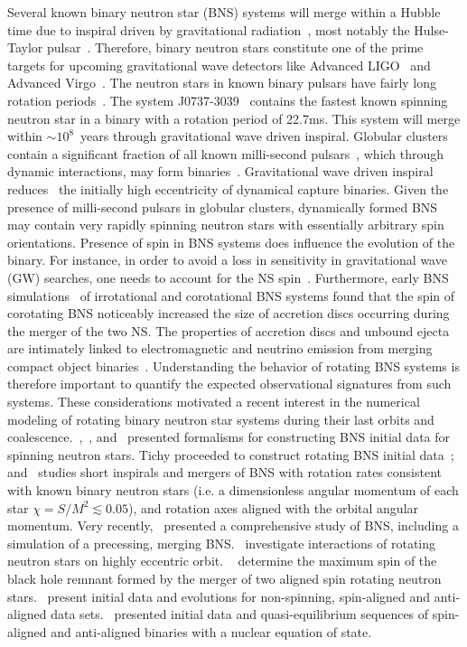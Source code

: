 Several known binary neutron star (BNS) systems  will merge within a
Hubble time due to inspiral driven by gravitational
radiation~\citep{Lorimer2008}, most notably the Hulse-Taylor
pulsar~\citep{Hulse:1975uf}. Therefore, binary neutron stars
constitute one of the prime targets for upcoming gravitational wave
detectors like Advanced LIGO~\citep{aLIGO1,aLIGO2} and Advanced
Virgo~\citep{AdV,TheVirgo:2014hva}.
The neutron stars in known binary pulsars have fairly long rotation
periods~\citep{Lorimer2008}. The system J0737-3039~\citep{Lyne:2004cj}
contains the fastest known spinning neutron star in a binary with a
rotation period of 22.7ms. This system will merge within $\sim
10^8$~years through gravitational wave driven inspiral. Globular
clusters contain a significant fraction of all known milli-second
pulsars~\citep{Lorimer2008}, which through dynamic interactions, may
form binaries~\citep{2010ApJ...720..953L,Benacquista:2011kv}. Gravitational wave driven
inspiral reduces~\citep{PetersMathews1963,Peters1964} the initially
high eccentricity of dynamical capture binaries.
Given the presence of milli-second pulsars in
globular clusters, dynamically formed BNS may contain very rapidly
spinning neutron stars with essentially arbitrary spin orientations.
Presence of spin in BNS systems does influence the evolution of the
binary. For instance, in order to avoid a loss in sensitivity in gravitational wave (GW)
searches, one needs to account for the NS spin~\citep{Brown:2012qf}.
Furthermore, early BNS simulations~\citep{Shibata00b} of irrotational
and corotational BNS systems found that the spin
of corotating BNS noticeably increased the size of accretion discs
occurring during the merger of the two NS. The properties of
accretion discs and unbound ejecta are intimately linked to
electromagnetic and neutrino emission from merging compact object
binaries~\citep{metzger:11}. 
Understanding the behavior of rotating BNS systems is therefore important to quantify the expected observational signatures from such systems.
These considerations motivated a recent interest in the numerical
modeling of rotating binary neutron star systems during their last
orbits and coalescence.~\cite{Baumgarte:2009fw},~\cite{Tichy:2011gw}, and~\cite{East:2012zn} presented formalisms for constructing BNS
initial data for spinning neutron stars. Tichy proceeded to construct
rotating BNS initial data~\citep{Tichy:2012rp}; and~\cite{Bernuzzi:2013rza} studies short inspirals and mergers of
BNS with rotation rates consistent with known binary neutron stars
(i.e. a dimensionless angular momentum of each star
$\chi=S/M^2\lesssim 0.05$), and rotation axes aligned with the orbital
angular momentum. Very recently,~\cite{Dietrich:2015pxa} presented a comprehensive study of BNS, including a simulation of a precessing, merging BNS.~\cite{East:2015yea} investigate
interactions of rotating neutron stars on highly eccentric orbit.
~\cite{Kastaun:2013mv} determine the maximum spin of the
black hole remnant formed by the merger of two aligned spin rotating
neutron stars.~\cite{Tsatsin:2013jca} present
initial data and evolutions for non-spinning, spin-aligned and
anti-aligned data sets.~\cite{Tsokaros:2015fea} presented initial data and quasi-equilibrium sequences
of spin-aligned and anti-aligned binaries with a nuclear equation of state.


